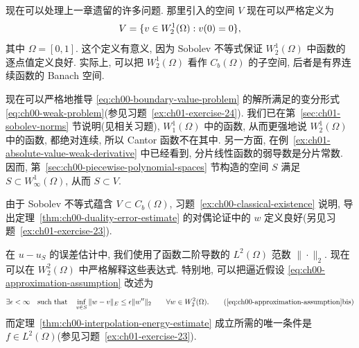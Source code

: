 现在可以处理上一章遗留的许多问题. 那里引入的空间 $V$ 现在可以严格定义为
\[
\MathBookFormulaID{formula-ch01-space-v-rigorous}
V=\{v\in W_2^1(\Omega):v(0)=0\},
\]
其中 $\Omega=[0,1]$. 这个定义有意义, 因为 Sobolev 不等式保证 $W_2^1(\Omega)$ 中函数的逐点值定义良好. 实际上, 可以把 $W_2^1(\Omega)$ 看作 $C_b(\Omega)$ 的子空间, 后者是有界连续函数的 Banach 空间.

现在可以严格地推导 \eqref{eq:ch00-boundary-value-problem} 的解所满足的变分形式 \eqref{eq:ch00-weak-problem}(参见习题~\ref{ex:ch01-exercise-24}). 我们已在第~\ref{sec:ch01-sobolev-norms} 节说明(见相关习题), $W_1^1(\Omega)$ 中的函数, 从而更强地说 $W_2^1(\Omega)$ 中的函数, 都绝对连续, 所以 Cantor 函数不在其中. 另一方面, 在例~\ref{ex:ch01-absolute-value-weak-derivative} 中已经看到, 分片线性函数的弱导数是分片常数. 因而, 第~\ref{sec:ch00-piecewise-polynomial-spaces} 节构造的空间 $S$ 满足 $S\subset W_\infty^1(\Omega)$, 从而 $S\subset V$.

由于 Sobolev 不等式蕴含 $V\subset C_b(\Omega)$, 习题~\ref{ex:ch00-classical-existence} 说明, 导出定理~\ref{thm:ch00-duality-error-estimate} 的对偶论证中的 $w$ 定义良好(另见习题~\ref{ex:ch01-exercise-23}).

在 $u-u_S$ 的误差估计中, 我们使用了函数二阶导数的 $L^2(\Omega)$ 范数 $\|\cdot\|_2$. 现在可以在 $W_2^2(\Omega)$ 中严格解释这些表达式. 特别地, 可以把逼近假设 \eqref{eq:ch00-approximation-assumption} 改述为
\begin{equation}
\MathBookFormulaID{formula-ch01-approximation-assumption-bis}
\exists\epsilon<\infty\quad\text{such that}\quad
\inf_{v\in S}\|w-v\|_E\leq\epsilon\|w''\|_2
\qquad\forall w\in W_2^2(\Omega).
\tag{\ref*{eq:ch00-approximation-assumption}bis}
\label{eq:ch01-approximation-assumption-bis}
\end{equation}
而定理~\ref{thm:ch00-interpolation-energy-estimate} 成立所需的唯一条件是 $f\in L^2(\Omega)$(参见习题~\ref{ex:ch01-exercise-23}).

